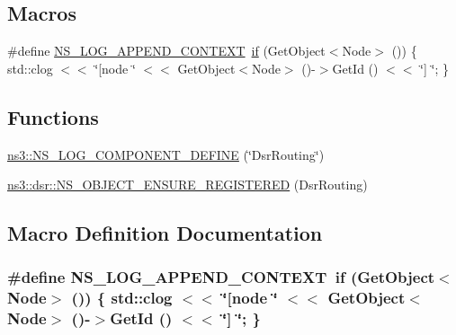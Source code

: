 \subsection*{Macros}
\begin{DoxyCompactItemize}
\item 
\#define \hyperlink{dsr-routing_8cc_abe50035652d407c40bdaef78214c4955}{N\+S\+\_\+\+L\+O\+G\+\_\+\+A\+P\+P\+E\+N\+D\+\_\+\+C\+O\+N\+T\+E\+XT}~\hyperlink{loss__OH__large__cities__urban_8m_ac77b6cfa3068152087725fe54b4ae8c8}{if} (Get\+Object$<$Node$>$ ()) \{ std\+::clog $<$$<$ \char`\"{}\mbox{[}node \char`\"{} $<$$<$ Get\+Object$<$Node$>$ ()-\/$>$Get\+Id () $<$$<$ \char`\"{}\mbox{]} \char`\"{}; \}
\end{DoxyCompactItemize}
\subsection*{Functions}
\begin{DoxyCompactItemize}
\item 
\hyperlink{namespacens3_a76115fc84fbef6d7f0ccb36f6c6c926b}{ns3\+::\+N\+S\+\_\+\+L\+O\+G\+\_\+\+C\+O\+M\+P\+O\+N\+E\+N\+T\+\_\+\+D\+E\+F\+I\+NE} (\char`\"{}Dsr\+Routing\char`\"{})
\item 
\hyperlink{namespacens3_1_1dsr_a6722e1304bbb42f26d252bb3e49f6e65}{ns3\+::dsr\+::\+N\+S\+\_\+\+O\+B\+J\+E\+C\+T\+\_\+\+E\+N\+S\+U\+R\+E\+\_\+\+R\+E\+G\+I\+S\+T\+E\+R\+ED} (Dsr\+Routing)
\end{DoxyCompactItemize}


\subsection{Macro Definition Documentation}
\subsubsection[{\texorpdfstring{N\+S\+\_\+\+L\+O\+G\+\_\+\+A\+P\+P\+E\+N\+D\+\_\+\+C\+O\+N\+T\+E\+XT}{NS_LOG_APPEND_CONTEXT}}]{\setlength{\rightskip}{0pt plus 5cm}\#define N\+S\+\_\+\+L\+O\+G\+\_\+\+A\+P\+P\+E\+N\+D\+\_\+\+C\+O\+N\+T\+E\+XT~{\bf if} (Get\+Object$<$Node$>$ ()) \{ std\+::clog $<$$<$ \char`\"{}\mbox{[}node \char`\"{} $<$$<$ Get\+Object$<$Node$>$ ()-\/$>$Get\+Id () $<$$<$ \char`\"{}\mbox{]} \char`\"{}; \}}\hypertarget{dsr-routing_8cc_abe50035652d407c40bdaef78214c4955}{}\label{dsr-routing_8cc_abe50035652d407c40bdaef78214c4955}
